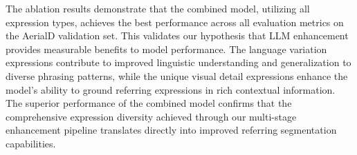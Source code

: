 The ablation results demonstrate that the combined model, utilizing all expression types, achieves the best performance across all evaluation metrics on the AerialD validation set. This validates our hypothesis that LLM enhancement provides measurable benefits to model performance. The language variation expressions contribute to improved linguistic understanding and generalization to diverse phrasing patterns, while the unique visual detail expressions enhance the model's ability to ground referring expressions in rich contextual information. The superior performance of the combined model confirms that the comprehensive expression diversity achieved through our multi-stage enhancement pipeline translates directly into improved referring segmentation capabilities.
